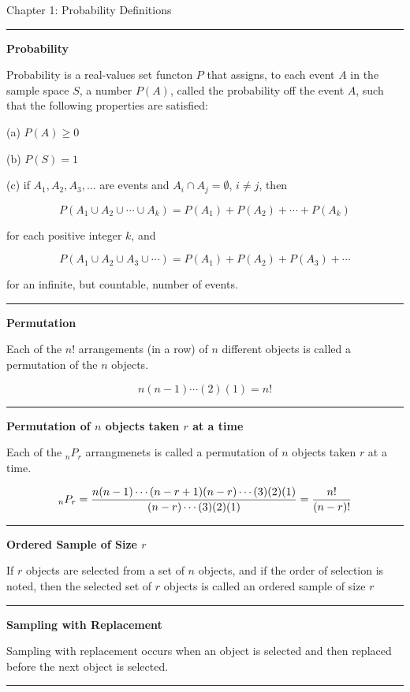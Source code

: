 \nopagenumbers
\centerline{Chapter 1: Probability Definitions}
\vskip 1mm
\hrule

\vskip 6pt
{\bf Probability} 

\vskip 3mm
Probability is a real-values set functon $P$ that assigns, to each event $A$ in the sample space $S$, a number $P(A)$, called the probability off the event $A$, such that the following properties are satisfied:

\vskip 6pt
(a) $P(A)\geq 0$

\vskip 6pt
(b) $P(S)=1$

\vskip 6pt
(c) if $A_1,A_2,A_3,\ldots$ are events and $A_i\cap A_j=\emptyset$, $i\neq j$, then

$$P(A_1\cup A_2\cup\cdots\cup A_k)=P(A_1)+P(A_2)+\cdots+P(A_k)$$

for each positive integer $k$, and

$$P(A_1\cup A_2\cup A_3\cup\cdots)=P(A_1)+P(A_2)+P(A_3)+\cdots$$

for an infinite, but countable, number of events.

\vskip 3mm
\hrule

\vskip 6pt
{\bf Permutation}

\vskip 6pt
Each of the $n!$ arrangements (in a row) of $n$ different objects is called a permutation of the $n$ objects.

$$n(n-1)\cdots(2)(1)=n!$$

\vskip 3mm
\hrule

\vskip 6pt
{\bf Permutation of $n$ objects taken $r$ at a time}

\vskip 1mm
Each of the ${}_nP_r$ arrangmenets is called a permutation of $n$ objects taken $r$ at a time.

$${}_nP_r={n(n-1)\cdots(n-r+1)(n-r)\cdots(3)(2)(1)\over (n-r)\cdots(3)(2)(1)}={n!\over (n-r)!}$$

\vskip 3mm
\hrule

\vskip 6pt
{\bf Ordered Sample of Size $r$}

\vskip 1mm
If $r$ objects are selected from a set of $n$ objects, and if the order of selection is noted, then the selected set of $r$ objects is called an ordered sample of size $r$

\vskip 3mm
\hrule

\vskip 6pt
{\bf Sampling with Replacement}

\vskip 1mm
Sampling with replacement occurs when an object is selected and then replaced before the next object is selected.

\vskip 3mm
\hrule

